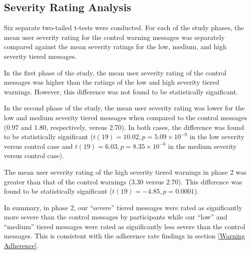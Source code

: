\subsection{Severity Rating Analysis}
Six separate two-tailed t-tests were conducted. For each of the study phases, the mean user severity rating for the control warning messages was separately compared against the mean severity ratings for the low, medium, and high severity tiered messages.

In the first phase of the study, the mean user severity rating of the control messages was higher than the ratings of the low and high severity tiered warnings. However, this difference was not found to be statistically significant.

In the second phase of the study, the mean user severity rating was lower for the low and medium severity tiered messages when compared to the control messages (0.97 and 1.80, respectively, versus 2.70). In both cases, the difference was found to be statistically significant ($t(19) = 10.02, p = 5.09 \times 10^{-9}$ in the low severity versus control case and $t(19) = 6.03, p = 8.35 \times 10^{-6}$ in the medium severity versus control case). 

The mean user severity rating of the high severity tiered warnings in phase 2 was greater than that of the control warnings (3.30 versus 2.70). This difference was found to be statistically significant ($t(19) = -4.85, p = 0.0001$).

In summary, in phase 2, our ``severe'' tiered messages were rated as significantly more severe than the control messages by participants while our ``low'' and ``medium'' tiered messages were rated as significantly less severe than the control messages. This is consistent with the adherence rate findings in section \ref{Warning Adherence}.
